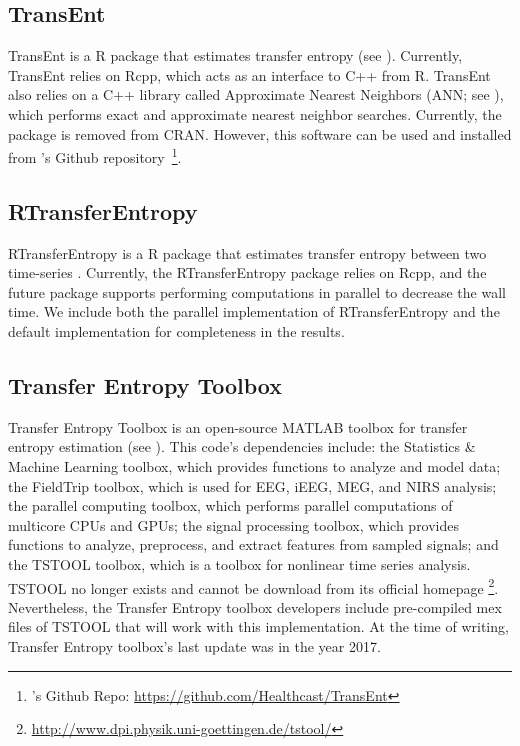 \subsection{TransEnt}
TransEnt is a R package that estimates transfer entropy (see \cite{TransEnt}). Currently, TransEnt relies on Rcpp, which acts as an interface to C++ from R. TransEnt also relies on a C++ library called Approximate Nearest Neighbors (ANN; see \cite{ANN}), which performs exact and approximate nearest neighbor searches. Currently, the package is removed from CRAN. However, this software can be used and installed from \cite{TransEnt}'s Github repository~\footnote{\cite{TransEnt}'s Github Repo: \url{https://github.com/Healthcast/TransEnt}}.

\subsection{RTransferEntropy}
RTransferEntropy is a R package that estimates transfer entropy between two time-series \cite{RTransferEntropy}. Currently, the RTransferEntropy package relies on Rcpp, and the future package supports performing computations in parallel to decrease the wall time. We include both the parallel implementation of RTransferEntropy and the default implementation for completeness in the results.


\subsection{Transfer Entropy Toolbox}

Transfer Entropy Toolbox  is an open-source MATLAB toolbox for transfer entropy estimation (see \cite{TransferEntropyToolbox}). This code's dependencies include: the Statistics \& Machine Learning toolbox, which provides functions to analyze and model data; the FieldTrip toolbox, which is used for EEG, iEEG, MEG, and NIRS analysis; the parallel computing toolbox, which performs parallel computations of multicore CPUs and GPUs; the signal processing toolbox, which provides functions to analyze, preprocess, and extract features from sampled signals; and the TSTOOL toolbox, which is a toolbox for nonlinear time series analysis. TSTOOL no longer exists and cannot be download from its official homepage \footnote{\url{http://www.dpi.physik.uni-goettingen.de/tstool/}}. Nevertheless, the Transfer Entropy toolbox developers include pre-compiled mex files of TSTOOL that will work with this implementation. At the time of writing,  Transfer Entropy toolbox's last update was in the year 2017.

